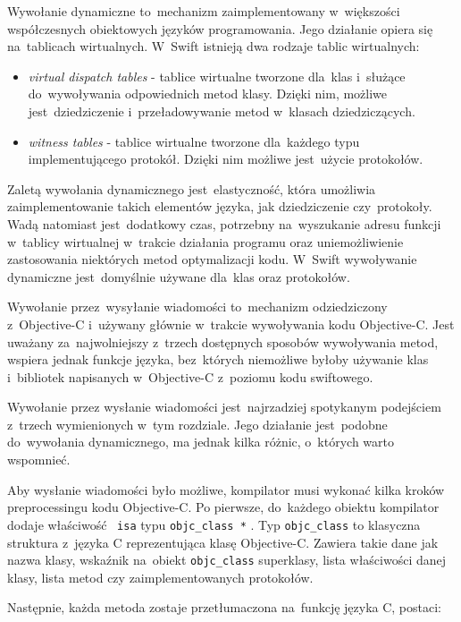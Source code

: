 \documentclass[mgr, shortabstract]{iithesis}
\newcommand{\objcinline}[1]{
    \texttt{#1}
}
\begin{document}
Wywołanie dynamiczne to~mechanizm zaimplementowany w~większości współczesnych obiektowych języków programowania. Jego działanie opiera się na~tablicach wirtualnych. W~Swift istnieją dwa rodzaje tablic wirtualnych:

\begin{itemize}
    \item \textit{virtual dispatch tables} - tablice wirtualne tworzone dla~klas i~służące do~wywoływania odpowiednich metod klasy. Dzięki nim, możliwe jest~dziedziczenie i~przeładowywanie metod w~klasach dziedziczących.
    \item \textit{witness tables} - tablice wirtualne tworzone dla~każdego typu implementującego protokół. Dzięki nim możliwe jest~użycie protokołów.
\end{itemize}

Zaletą wywołania dynamicznego jest~elastyczność, która umożliwia zaimplementowanie takich elementów języka, jak dziedziczenie czy~protokoły. Wadą natomiast jest~dodatkowy czas, potrzebny na~wyszukanie adresu funkcji w~tablicy wirtualnej w~trakcie działania programu oraz uniemożliwienie zastosowania niektórych metod optymalizacji kodu. W~Swift wywoływanie dynamiczne jest~domyślnie używane dla~klas oraz protokołów.

Wywołanie przez~wysyłanie wiadomości to~mechanizm odziedziczony z~Objective-C i~używany głównie w~trakcie wywoływania kodu Objective-C. Jest uważany za~najwolniejszy z~trzech dostępnych sposobów wywoływania metod, wspiera jednak funkcje języka, bez~których niemożliwe byłoby używanie klas i~bibliotek napisanych w~Objective-C z~poziomu kodu swiftowego.

Wywołanie przez wysłanie wiadomości jest~najrzadziej spotykanym podejściem z~trzech wymienionych w~tym rozdziale. Jego działanie jest~podobne do~wywołania dynamicznego, ma jednak kilka różnic, o~których warto wspomnieć.

Aby wysłanie wiadomości było możliwe, kompilator musi wykonać kilka kroków preprocessingu kodu Objective-C. Po pierwsze, do~każdego obiektu kompilator dodaje właściwość \objcinline{isa} typu \objcinline{objc_class *}. Typ \objcinline{objc_class} to klasyczna struktura z~języka C reprezentująca klasę Objective-C. Zawiera takie dane jak nazwa klasy, wskaźnik na~obiekt \objcinline{objc_class} superklasy, lista właściwości danej klasy, lista metod czy zaimplementowanych protokołów.

Następnie, każda metoda zostaje przetłumaczona na~funkcję języka C, postaci:
\end{document}
